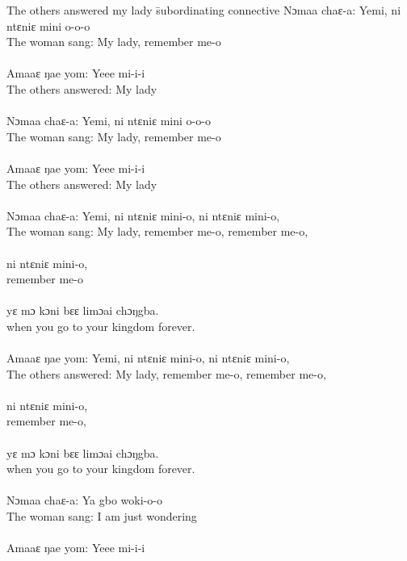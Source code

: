 \begin{tabbing}
The others answered my lady\hspace{1ex} \= subordinating connective\kill
Nɔmaa chaɛ-a:      \>         Yemi, ni ntɛniɛ mini o-o-o\\
The woman sang:   \>     My lady, remember me-o\\
\\
Amaaɛ ŋae yom:    \>      Yeee mi-i-i\\
The others answered:  \>  My lady\\
\\
Nɔmaa chaɛ-a:     \>     Yemi, ni ntɛniɛ mini o-o-o\\
The woman sang:   \>     My lady, remember me-o\\
\\
Amaaɛ ŋae yom:   \>      Yeee mi-i-i\\
The others answered:  \>   My lady\\
\\
Nɔmaa chaɛ-a:  \>        Yemi, ni ntɛniɛ mini-o, ni ntɛniɛ mini-o,\\ 
The woman sang:  \>      My lady, remember me-o, remember me-o,\\ 
\\
 \>   ni ntɛniɛ mini-o,\\
 \>    remember me-o\\
 \\
 \>                   yɛ mɔ kɔni bɛɛ limɔai chɔŋgba.\\
 \>                    when you go to your kingdom forever.\\
\\
Amaaɛ ŋae yom:    \>     Yemi, ni ntɛniɛ mini-o, ni ntɛniɛ mini-o,\\
The others answered:  \>  My lady, remember me-o, remember me-o,\\ 
\\
\>  ni ntɛniɛ mini-o,\\
\> remember me-o,\\
 \\
\>yɛ mɔ kɔni bɛɛ limɔai chɔŋgba.\\
\> when you go to your kingdom forever.\\
\\
Nɔmaa chaɛ-a:   \>      Ya gbo woki-o-o\\
The woman sang:  \>     I am just wondering\\
\\
Amaaɛ ŋae yom:   \>     Yeee mi-i-i\\

\end{tabbing}
